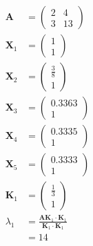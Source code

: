 \documentclass{article}
\begin{document}
\begin{align*}
  \mathbf{A}   & = \begin{pmatrix}
                     2 & 4  \\
                     3 & 13
                   \end{pmatrix}                                                                     \\
  \mathbf{X}_1 & = \begin{pmatrix}
                     1 \\
                     1
                   \end{pmatrix}                                                                     \\
  \mathbf{X}_2 & = \begin{pmatrix}
                     \frac{3}{8} \\
                     1
                   \end{pmatrix}                                                                     \\
  \mathbf{X}_3 & = \begin{pmatrix}
                     0.3363 \\
                     1
                   \end{pmatrix}                                                                     \\
  \mathbf{X}_4 & = \begin{pmatrix}
                     0.3335 \\
                     1
                   \end{pmatrix}                                                                     \\
  \mathbf{X}_5 & = \begin{pmatrix}
                     0.3333 \\
                     1
                   \end{pmatrix}                                                                     \\
  \mathbf{K}_1 & = \begin{pmatrix}
                     \frac{1}{3} \\
                     1
                   \end{pmatrix}                                                                     \\
  \lambda_1    & = \frac{\mathbf{A} \mathbf{K}_1 \cdot \mathbf{K}_1}{\mathbf{K}_1 \cdot \mathbf{K}_1} \\
               & = 14
\end{align*}
\end{document}
